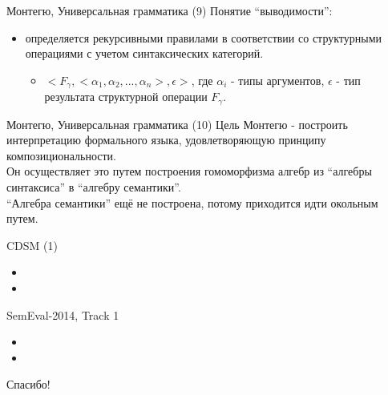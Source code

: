 \documentclass{beamer}
\begin{document}
\begin{frame}{Монтегю, Универсальная грамматика (9)}
Понятие ``выводимости'':\\
\begin{itemize}
  \item определяется рекурсивными правилами в соответствии со структурными операциями с учетом синтаксических категорий.
    \begin{itemize}
      \item $< \! F_\gamma, < \! \alpha_1, \alpha_2, ... , \alpha_n \! >, \epsilon \!>$, где $\alpha_i$ - типы аргументов, $\epsilon$ - тип результата структурной операции $F_\gamma$.
    \end{itemize}
\end{itemize}
\end{frame}

\begin{frame}{Монтегю, Универсальная грамматика (10)}
Цель Монтегю - построить интерпретацию формального языка, удовлетворяющую принципу композициональности.\\
\bigskip
Он осуществляет это путем построения гомоморфизма алгебр из ``алгебры синтаксиса'' в ``алгебру семантики''.\\
\bigskip
``Алгебра семантики'' ещё не построена, потому приходится идти окольным путем.
\end{frame}




\begin{frame}{CDSM (1)}
\begin{itemize}
  \item 
  \item 
\end{itemize}
\end{frame}

\begin{frame}{SemEval-2014, Track 1}
\begin{itemize}
  \item 
  \item 
\end{itemize}
\end{frame}

\begin{frame}{}
    \thispagestyle{empty}
    \begin{center}
        {\large Спасибо!}
    \end{center}
\end{frame}


\end{document}
